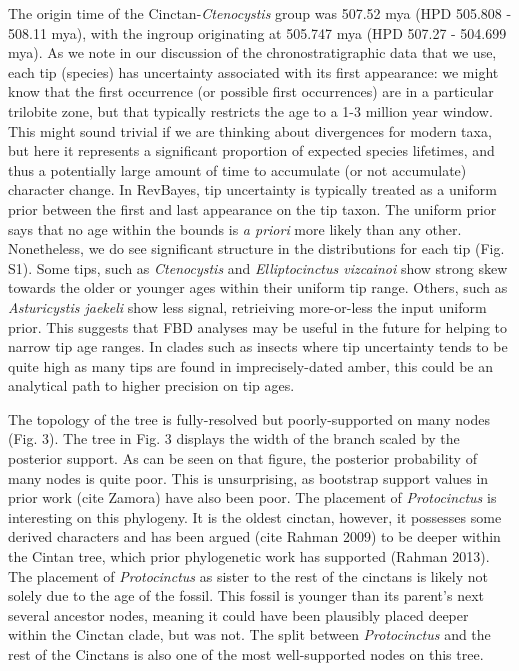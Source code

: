 \documentclass{article}
\begin{document}
The origin time of the Cinctan-\textit{Ctenocystis} group was 507.52 mya (HPD 505.808 - 508.11 mya), with the ingroup originating at 505.747 mya (HPD 507.27 - 504.699 mya).
As we note in our discussion of the chronostratigraphic data that we use, each tip (species) has uncertainty associated with its first appearance: we might know that the first occurrence (or possible first occurrences) are in a particular trilobite zone, but that typically restricts the age to a 1-3 million year window.  This might sound trivial if we are thinking about divergences for modern taxa, but here it represents a significant proportion of expected species lifetimes, and thus a potentially large amount of time to accumulate (or not accumulate) character change.
In RevBayes, tip uncertainty is typically treated as a uniform prior between the first and last appearance on the tip taxon.
The uniform prior says that no age within the bounds is \textit{a priori} more likely than any other.
Nonetheless, we do see significant structure in the distributions for each tip (Fig. S1). 
Some tips, such as \textit{Ctenocystis} and \textit{Elliptocinctus vizcainoi} show strong skew towards the older or younger ages within their uniform tip range.
Others, such as \textit{Asturicystis jaekeli} show less signal, retrieiving more-or-less the input uniform prior.
This suggests that FBD analyses may be useful in the future for helping to narrow tip age ranges.
In clades such as insects where tip uncertainty tends to be quite high as many tips are found in imprecisely-dated amber, this could be an analytical path to higher precision on tip ages.

The topology of the tree is fully-resolved but poorly-supported on many nodes (Fig. 3).
The tree in Fig. 3 displays the width of the branch scaled by the posterior support.
As can be seen on that figure, the posterior probability of many nodes is quite poor. 
This is unsurprising, as bootstrap support values in prior work (cite Zamora) have also been poor.
The placement of \textit{Protocinctus} is interesting on this phylogeny. 
It is the oldest cinctan, however, it possesses some derived characters and has been argued (cite Rahman 2009) to be deeper within the Cintan tree, which prior phylogenetic work has supported (Rahman 2013). 
The placement of \textit{Protocinctus} as sister to the rest of the cinctans is likely not solely due to the age of the fossil. This fossil is younger than its parent's next several ancestor nodes, meaning it could have been plausibly placed deeper within the Cinctan clade, but was not. 
The split between \textit{Protocinctus} and the rest of the Cinctans is also one of the most well-supported nodes on this tree.
\end{document}
